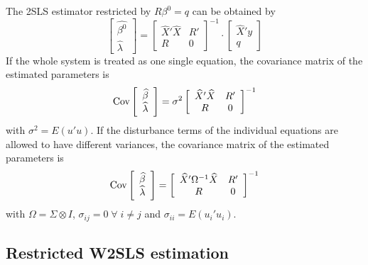The 2SLS estimator restricted by $R \beta^0 = q$ can be obtained by
\begin{equation}
   \left[ \begin{array}{c}
      \widehat{\beta^0} \\ \widehat{\lambda}
   \end{array} \right]
   =
   \left[ \begin{array}{cc}
      \widehat{X}' \widehat{X} & R' \\ 
      R & 0
   \end{array} \right]^{-1}
   \cdot
   \left[ \begin{array}{c}
      \widehat{X}' y \\ q 
   \end{array} \right]
   \label{eq:beta2SLSr}
\end{equation}
If the whole system is treated as one single equation,
the covariance matrix of the estimated parameters is
\begin{equation}
   \text{Cov} 
   \left[ \begin{array}{c}
      \widehat{\beta} \\ \widehat{\lambda}
   \end{array} \right] 
   = \sigma^2 
   \left[ \begin{array}{cc}
      \widehat{X}' \widehat{X} & R' \\ 
      R & 0
   \end{array} \right]^{-1}
\end{equation}
with $\sigma^2 = E \left( u' u \right)$.
If the disturbance terms of the individual equations
are allowed to have different variances, 
the covariance matrix of the estimated parameters is
\begin{equation}
   \text{Cov} 
   \left[ \begin{array}{c}
      \widehat{\beta} \\ \widehat{\lambda}
   \end{array} \right] 
   = 
   \left[ \begin{array}{cc}
      \widehat{X}' \Omega^{-1} \widehat{X} & R' \\ 
      R & 0
   \end{array} \right]^{-1}
\end{equation}
with $\Omega = \Sigma \otimes I$, 
$\sigma_{ij} = 0 \; \forall \; i \neq j$ and
$\sigma_{ii} = E \left( u_i' u_i \right)$.


\subsection{Restricted W2SLS estimation}


